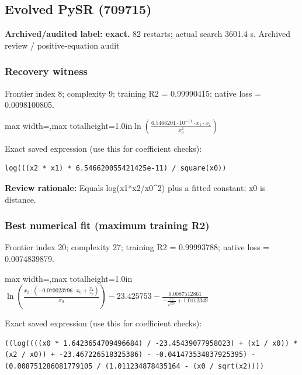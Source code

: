 \documentclass[10pt,letterpaper,landscape]{article}
\begin{document}
\begin{minipage}[t]{0.485\textwidth}
\subsection*{Evolved PySR (709715)}
\textbf{Archived/audited label: exact.} 82 restarts; actual search 3601.4 s.
{\small Archived review / positive-equation audit}
\subsubsection*{Recovery witness}
Frontier index 8; complexity 9; training R2 = 0.99990415; native loss = 0.0098100805.
\begin{center}\begin{adjustbox}{max width=\linewidth,max totalheight=1.0in}$\displaystyle \ln{\left(\frac{6.5466201 \cdot 10^{-11} \cdot x_{1} \cdot x_{2}}{x_{0}^{2}} \right)}$\end{adjustbox}\end{center}
{\scriptsize Exact saved expression (use this for coefficient checks):}
\begin{lstlisting}
log(((x2 * x1) * 6.546620055421425e-11) / square(x0))
\end{lstlisting}
{\small\textbf{Review rationale:} Equals log(x1*x2/x0\textasciicircum{}2) plus a fitted constant; x0 is distance.}
\subsubsection*{Best numerical fit (maximum training R2)}
Frontier index 20; complexity 27; training R2 = 0.99993788; native loss = 0.0074839879.
\begin{center}\begin{adjustbox}{max width=\linewidth,max totalheight=1.0in}$\displaystyle \ln{\left(\frac{x_{2} \cdot \left(- 0.070023796 \cdot x_{0} + \frac{x_{1}}{x_{0}}\right)}{x_{0}} \right)} - 23.425753 - \frac{0.0087512861}{- \frac{x_{0}}{\sqrt{x_{2}}} + 1.0112349}$\end{adjustbox}\end{center}
{\scriptsize Exact saved expression (use this for coefficient checks):}
\begin{lstlisting}
((log((((x0 * 1.6423654709496684) / -23.45439077958023) + (x1 / x0)) * (x2 / x0)) + -23.467226518325386) - -0.041473534837925395) - (0.008751286081779105 / (1.011234878435164 - (x0 / sqrt(x2))))
\end{lstlisting}
\end{minipage}
\clearpage{}\label{newton-10008}
\end{document}
